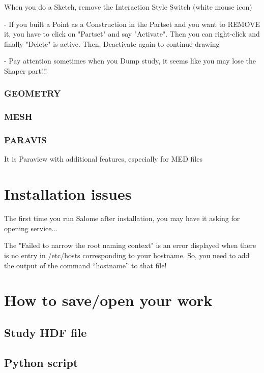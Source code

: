 \documentclass[10pt]{book}
\begin{document}
 When you do a Sketch, remove the Interaction Style Switch (white mouse icon)
 
 - If you built a Point as a Construction in the Partset and you want to REMOVE it, you have to click on "Partset" and say "Activate". 
   Then you can right-click and finally "Delete" is active. Then, Deactivate again to continue drawing

 - Pay attention sometimes when you Dump study, it seems like you may lose the Shaper part!!!  
   
 \subsection{GEOMETRY}
 

 \subsection{MESH}

 
  \subsection{PARAVIS}
  
  
  It is Paraview with additional features, especially for MED files

  
  
\chapter{Installation issues}

  The first time you run Salome after installation,
  you may have it asking for opening service...

The "Failed to narrow the root naming context" 
is an error displayed when there is no entry in /etc/hosts 
corresponding to your hostname. So, you need to add the output of the command
 ``hostname'' to that file!

\chapter{How to save/open your work}

  \section{Study HDF file}

  
  \section{Python script}
\end{document}

